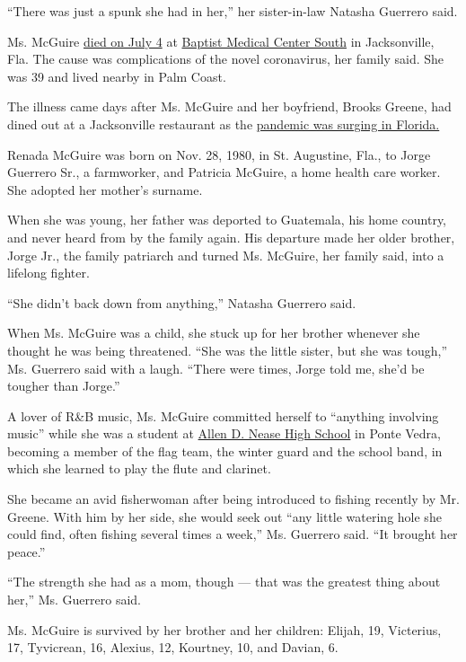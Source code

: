 ``There was just a spunk she had in her,'' her sister-in-law Natasha
Guerrero said.

Ms. McGuire
\href{https://www.firstcoastnews.com/article/news/local/st-augustine-mother-of-6-dies-from-covid-19/77-1572d6fb-5c26-472b-8264-8ba23cbcbcfa}{died
on July 4} at
\href{https://www.baptistjax.com/locations/baptist-medical-center-south}{Baptist
Medical Center South} in Jacksonville, Fla. The cause was complications
of the novel coronavirus, her family said. She was 39 and lived nearby
in Palm Coast.

The illness came days after Ms. McGuire and her boyfriend, Brooks
Greene, had dined out at a Jacksonville restaurant as the
\href{https://www.nytimes.com/2020/07/12/us/florida-coronavirus-covid-cases.html}{pandemic
was surging in Florida.}

Renada McGuire was born on Nov. 28, 1980, in St. Augustine, Fla., to
Jorge Guerrero Sr., a farmworker, and Patricia McGuire, a home health
care worker. She adopted her mother's surname.

When she was young, her father was deported to Guatemala, his home
country, and never heard from by the family again. His departure made
her older brother, Jorge Jr., the family patriarch and turned Ms.
McGuire, her family said, into a lifelong fighter.

``She didn't back down from anything,'' Natasha Guerrero said.

When Ms. McGuire was a child, she stuck up for her brother whenever she
thought he was being threatened. ``She was the little sister, but she
was tough,'' Ms. Guerrero said with a laugh. ``There were times, Jorge
told me, she'd be tougher than Jorge.''

A lover of R\&B music, Ms. McGuire committed herself to ``anything
involving music'' while she was a student at
\href{https://www-nhs.stjohns.k12.fl.us/}{Allen D. Nease High School} in
Ponte Vedra, becoming a member of the flag team, the winter guard and
the school band, in which she learned to play the flute and clarinet.

She became an avid fisherwoman after being introduced to fishing
recently by Mr. Greene. With him by her side, she would seek out ``any
little watering hole she could find, often fishing several times a
week,'' Ms. Guerrero said. ``It brought her peace.''

``The strength she had as a mom, though --- that was the greatest thing
about her,'' Ms. Guerrero said.

Ms. McGuire is survived by her brother and her children: Elijah, 19,
Victerius, 17, Tyvicrean, 16, Alexius, 12, Kourtney, 10, and Davian, 6.


